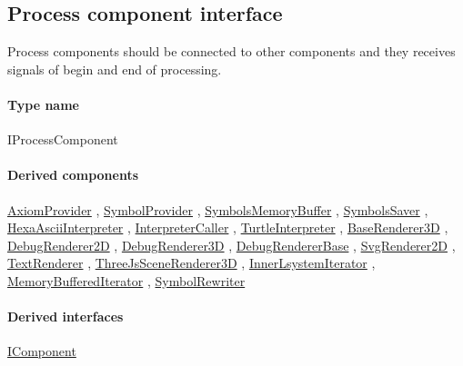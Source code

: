 \subsection{Process component interface}
\label{Malsys.Processing.Components.IProcessComponent}
Process components should be connected to other components and they
            	receives signals of begin and end of processing.\paragraph{Type name}
IProcessComponent	\paragraph{Derived components}
		\hyperref[Malsys.Processing.Components.Common.AxiomProvider]{AxiomProvider}%
, 		\hyperref[Malsys.Processing.Components.Common.SymbolProvider]{SymbolProvider}%
, 		\hyperref[Malsys.Processing.Components.Common.SymbolsMemoryBuffer]{SymbolsMemoryBuffer}%
, 		\hyperref[Malsys.Processing.Components.Common.SymbolsSaver]{SymbolsSaver}%
, 		\hyperref[Malsys.Processing.Components.Interpreters.HexaAsciiInterpreter]{HexaAsciiInterpreter}%
, 		\hyperref[Malsys.Processing.Components.Interpreters.InterpreterCaller]{InterpreterCaller}%
, 		\hyperref[Malsys.Processing.Components.Interpreters.TurtleInterpreter]{TurtleInterpreter}%
, 		\hyperref[Malsys.Processing.Components.Renderers.BaseRenderer3D]{BaseRenderer3D}%
, 		\hyperref[Malsys.Processing.Components.Renderers.DebugRenderer2D]{DebugRenderer2D}%
, 		\hyperref[Malsys.Processing.Components.Renderers.DebugRenderer3D]{DebugRenderer3D}%
, 		\hyperref[Malsys.Processing.Components.Renderers.DebugRendererBase]{DebugRendererBase}%
, 		\hyperref[Malsys.Processing.Components.Renderers.SvgRenderer2D]{SvgRenderer2D}%
, 		\hyperref[Malsys.Processing.Components.Renderers.TextRenderer]{TextRenderer}%
, 		\hyperref[Malsys.Processing.Components.Renderers.ThreeJsSceneRenderer3D]{ThreeJsSceneRenderer3D}%
, 		\hyperref[Malsys.Processing.Components.RewriterIterators.InnerLsystemIterator]{InnerLsystemIterator}%
, 		\hyperref[Malsys.Processing.Components.RewriterIterators.MemoryBufferedIterator]{MemoryBufferedIterator}%
, 		\hyperref[Malsys.Processing.Components.Rewriters.SymbolRewriter]{SymbolRewriter}%
	\paragraph{Derived interfaces}
		\hyperref[Malsys.Processing.Components.IComponent]{IComponent}%
